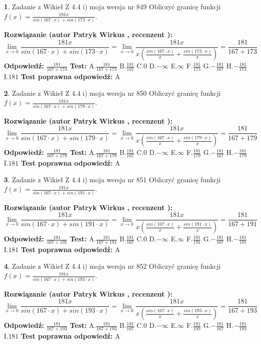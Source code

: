 \documentclass[12pt, a4paper]{article}
\theoremstyle{definition} %
\newtheorem{zad}{}
\newcommand{\zadStart}[1]{\begin{zad}#1\newline}
\newcommand{\zadStop}{\end{zad}}
\newcommand{\rozwStart}[2]{\noindent \textbf{Rozwiązanie (autor #1 , recenzent #2): }\newline}
\newcommand{\rozwStop}{\newline}
\newcommand{\odpStart}{\noindent \textbf{Odpowiedź:}\newline}
\newcommand{\odpStop}{\newline}
\newcommand{\testStart}{\noindent \textbf{Test:}\newline}
\newcommand{\testStop}{\newline}
\newcommand{\kluczStart}{\noindent \textbf{Test poprawna odpowiedź:}\newline}
\newcommand{\kluczStop}{\newline}
\begin{document}
\zadStart{Zadanie z Wikieł Z 4.4 i) moja wersja nr 849}
Obliczyć granicę funkcji $f(x)=\frac{181x}{sin(167\cdot x) +sin(173\cdot x)}$.
\zadStop
\rozwStart{Patryk Wirkus}{}
$$\lim\limits_{x\to 0}\frac{181x}{sin(167\cdot x) +sin(173\cdot x)}=\lim\limits_{x\to 0}\frac{181x}{x(\frac{sin(167\cdot x)}{x}+\frac{sin(173\cdot x)}{x})}=\frac{181}{167+173}$$
\rozwStop
\odpStart
$\frac{181}{167+173}$
\odpStop
\testStart
A.$\frac{181}{167+173}$
B.$\frac{181}{167}$
C.$0$
D.$-\infty$
E.$\infty$
F.$\frac{181}{173}$
G.$-\frac{181}{167}$
H.$-\frac{181}{173}$
I.$181$
\testStop
\kluczStart
A
\kluczStop



\zadStart{Zadanie z Wikieł Z 4.4 i) moja wersja nr 850}
Obliczyć granicę funkcji $f(x)=\frac{181x}{sin(167\cdot x) +sin(179\cdot x)}$.
\zadStop
\rozwStart{Patryk Wirkus}{}
$$\lim\limits_{x\to 0}\frac{181x}{sin(167\cdot x) +sin(179\cdot x)}=\lim\limits_{x\to 0}\frac{181x}{x(\frac{sin(167\cdot x)}{x}+\frac{sin(179\cdot x)}{x})}=\frac{181}{167+179}$$
\rozwStop
\odpStart
$\frac{181}{167+179}$
\odpStop
\testStart
A.$\frac{181}{167+179}$
B.$\frac{181}{167}$
C.$0$
D.$-\infty$
E.$\infty$
F.$\frac{181}{179}$
G.$-\frac{181}{167}$
H.$-\frac{181}{179}$
I.$181$
\testStop
\kluczStart
A
\kluczStop



\zadStart{Zadanie z Wikieł Z 4.4 i) moja wersja nr 851}
Obliczyć granicę funkcji $f(x)=\frac{181x}{sin(167\cdot x) +sin(191\cdot x)}$.
\zadStop
\rozwStart{Patryk Wirkus}{}
$$\lim\limits_{x\to 0}\frac{181x}{sin(167\cdot x) +sin(191\cdot x)}=\lim\limits_{x\to 0}\frac{181x}{x(\frac{sin(167\cdot x)}{x}+\frac{sin(191\cdot x)}{x})}=\frac{181}{167+191}$$
\rozwStop
\odpStart
$\frac{181}{167+191}$
\odpStop
\testStart
A.$\frac{181}{167+191}$
B.$\frac{181}{167}$
C.$0$
D.$-\infty$
E.$\infty$
F.$\frac{181}{191}$
G.$-\frac{181}{167}$
H.$-\frac{181}{191}$
I.$181$
\testStop
\kluczStart
A
\kluczStop



\zadStart{Zadanie z Wikieł Z 4.4 i) moja wersja nr 852}
Obliczyć granicę funkcji $f(x)=\frac{181x}{sin(167\cdot x) +sin(193\cdot x)}$.
\zadStop
\rozwStart{Patryk Wirkus}{}
$$\lim\limits_{x\to 0}\frac{181x}{sin(167\cdot x) +sin(193\cdot x)}=\lim\limits_{x\to 0}\frac{181x}{x(\frac{sin(167\cdot x)}{x}+\frac{sin(193\cdot x)}{x})}=\frac{181}{167+193}$$
\rozwStop
\odpStart
$\frac{181}{167+193}$
\odpStop
\testStart
A.$\frac{181}{167+193}$
B.$\frac{181}{167}$
C.$0$
D.$-\infty$
E.$\infty$
F.$\frac{181}{193}$
G.$-\frac{181}{167}$
H.$-\frac{181}{193}$
I.$181$
\testStop
\kluczStart
A
\kluczStop
\end{document}
